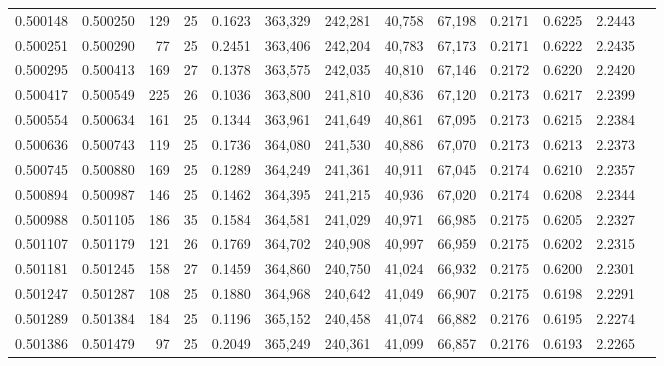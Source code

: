 \begin{tabular}{rrrrrrrrrrrrr}
0.500148 & 0.500250 & 129 &  25 &                                     0.1623 & 363,329 & 242,281 &  40,758 &  67,198 & 0.2171 & 0.6225 & 2.2443 \\
0.500251 & 0.500290 &  77 &  25 &                                     0.2451 & 363,406 & 242,204 &  40,783 &  67,173 & 0.2171 & 0.6222 & 2.2435 \\
0.500295 & 0.500413 & 169 &  27 &                                     0.1378 & 363,575 & 242,035 &  40,810 &  67,146 & 0.2172 & 0.6220 & 2.2420 \\
0.500417 & 0.500549 & 225 &  26 &                                     0.1036 & 363,800 & 241,810 &  40,836 &  67,120 & 0.2173 & 0.6217 & 2.2399 \\
0.500554 & 0.500634 & 161 &  25 &                                     0.1344 & 363,961 & 241,649 &  40,861 &  67,095 & 0.2173 & 0.6215 & 2.2384 \\
0.500636 & 0.500743 & 119 &  25 &                                     0.1736 & 364,080 & 241,530 &  40,886 &  67,070 & 0.2173 & 0.6213 & 2.2373 \\
0.500745 & 0.500880 & 169 &  25 &                                     0.1289 & 364,249 & 241,361 &  40,911 &  67,045 & 0.2174 & 0.6210 & 2.2357 \\
0.500894 & 0.500987 & 146 &  25 &                                     0.1462 & 364,395 & 241,215 &  40,936 &  67,020 & 0.2174 & 0.6208 & 2.2344 \\
0.500988 & 0.501105 & 186 &  35 &                                     0.1584 & 364,581 & 241,029 &  40,971 &  66,985 & 0.2175 & 0.6205 & 2.2327 \\
0.501107 & 0.501179 & 121 &  26 &                                     0.1769 & 364,702 & 240,908 &  40,997 &  66,959 & 0.2175 & 0.6202 & 2.2315 \\
0.501181 & 0.501245 & 158 &  27 &                                     0.1459 & 364,860 & 240,750 &  41,024 &  66,932 & 0.2175 & 0.6200 & 2.2301 \\
0.501247 & 0.501287 & 108 &  25 &                                     0.1880 & 364,968 & 240,642 &  41,049 &  66,907 & 0.2175 & 0.6198 & 2.2291 \\
0.501289 & 0.501384 & 184 &  25 &                                     0.1196 & 365,152 & 240,458 &  41,074 &  66,882 & 0.2176 & 0.6195 & 2.2274 \\
0.501386 & 0.501479 &  97 &  25 &                                     0.2049 & 365,249 & 240,361 &  41,099 &  66,857 & 0.2176 & 0.6193 & 2.2265 \\

\end{tabular}
